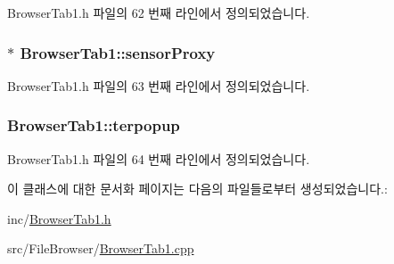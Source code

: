Browser\+Tab1.\+h 파일의 62 번째 라인에서 정의되었습니다.

\hypertarget{class_browser_tab1_a7dc2f8e362bbc5c88cedb59e0b38cbea}{
\subsubsection[{sensor\+Proxy}]{$\ast$ Browser\+Tab1\+::sensor\+Proxy\hspace{0.3cm}{\ttfamily [private]}}}\label{class_browser_tab1_a7dc2f8e362bbc5c88cedb59e0b38cbea}


Browser\+Tab1.\+h 파일의 63 번째 라인에서 정의되었습니다.

\hypertarget{class_browser_tab1_a69eaa59d7c5277fe9819b3b7fa7bbea4}{
\subsubsection[{terpopup}]{ Browser\+Tab1\+::terpopup\hspace{0.3cm}{\ttfamily [private]}}}\label{class_browser_tab1_a69eaa59d7c5277fe9819b3b7fa7bbea4}


Browser\+Tab1.\+h 파일의 64 번째 라인에서 정의되었습니다.



이 클래스에 대한 문서화 페이지는 다음의 파일들로부터 생성되었습니다.\+:\begin{DoxyCompactItemize}
\item 
inc/\hyperlink{_browser_tab1_8h}{Browser\+Tab1.\+h}\item 
src/\+File\+Browser/\hyperlink{_browser_tab1_8cpp}{Browser\+Tab1.\+cpp}\end{DoxyCompactItemize}
